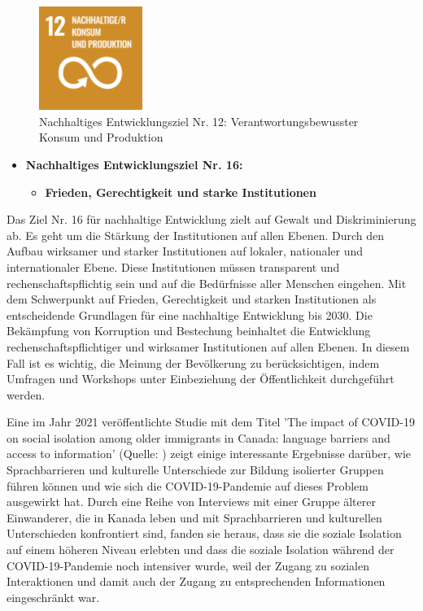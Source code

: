 \begin{figure}[H]
    \centering
    \includegraphics[width=0.3\textwidth]{pics/SDG-12.png}
    \caption{Nachhaltiges Entwicklungsziel Nr. 12: Verantwortungsbewusster Konsum und Produktion}
    \label{fig:SDG12}
\end{figure}

\begin{itemize}
    \item \textbf{Nachhaltiges Entwicklungsziel Nr. 16: }
          \begin{itemize}
              \item \textbf{Frieden, Gerechtigkeit und starke Institutionen}
          \end{itemize}
\end{itemize}

Das Ziel Nr. 16 für nachhaltige Entwicklung zielt auf Gewalt und Diskriminierung ab. Es geht um die Stärkung der Institutionen auf allen Ebenen. Durch den Aufbau wirksamer und starker Institutionen auf lokaler, nationaler und internationaler Ebene. Diese Institutionen müssen transparent und rechenschaftspflichtig sein und auf die Bedürfnisse aller Menschen eingehen. Mit dem Schwerpunkt auf Frieden, Gerechtigkeit und starken Institutionen als entscheidende Grundlagen für eine nachhaltige Entwicklung bis 2030. Die Bekämpfung von Korruption und Bestechung beinhaltet die Entwicklung rechenschaftspflichtiger und wirksamer Institutionen auf allen Ebenen. In diesem Fall ist es wichtig, die Meinung der Bevölkerung zu berücksichtigen, indem Umfragen und Workshops unter Einbeziehung der Öffentlichkeit durchgeführt werden.

Eine im Jahr 2021 veröffentlichte Studie mit dem Titel 'The impact of COVID-19 on social isolation among older immigrants in Canada: language barriers and access to information' (Quelle: ) zeigt einige interessante Ergebnisse darüber, wie Sprachbarrieren und kulturelle Unterschiede zur Bildung isolierter Gruppen führen können und wie sich die COVID-19-Pandemie auf dieses Problem ausgewirkt hat. Durch eine Reihe von Interviews mit einer Gruppe älterer Einwanderer, die in Kanada leben und mit Sprachbarrieren und kulturellen Unterschieden konfrontiert sind, fanden sie heraus, dass sie die soziale Isolation auf einem höheren Niveau erlebten und dass die soziale Isolation während der COVID-19-Pandemie noch intensiver wurde, weil der Zugang zu sozialen Interaktionen und damit auch der Zugang zu entsprechenden Informationen eingeschränkt war.

